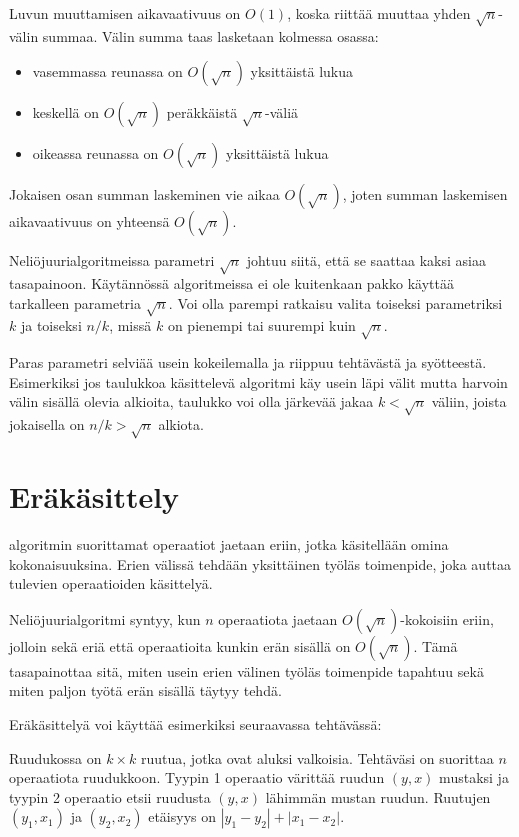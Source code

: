 Luvun muuttamisen aikavaativuus on
$O(1)$, koska riittää muuttaa yhden $\sqrt n$-välin summaa.
Välin summa taas lasketaan kolmessa osassa:

\begin{itemize}
\item vasemmassa reunassa on $O(\sqrt n)$ yksittäistä lukua
\item keskellä on $O(\sqrt n)$ peräkkäistä $\sqrt n$-väliä
\item oikeassa reunassa on $O(\sqrt n)$ yksittäistä lukua
\end{itemize}

Jokaisen osan summan laskeminen vie aikaa $O(\sqrt n)$,
joten summan laskemisen aikavaativuus on yhteensä $O(\sqrt n)$.

Neliöjuurialgoritmeissa parametri $\sqrt n$
johtuu siitä, että se saattaa kaksi asiaa tasapainoon.
Käytännössä algoritmeissa
ei ole kuitenkaan pakko käyttää
tarkalleen parametria $\sqrt n$.
Voi olla parempi ratkaisu valita toiseksi
parametriksi $k$ ja toiseksi $n/k$,
missä $k$ on pienempi tai suurempi kuin $\sqrt n$.

Paras parametri selviää usein kokeilemalla
ja riippuu tehtävästä ja syötteestä.
Esimerkiksi jos taulukkoa käsittelevä algoritmi
käy usein läpi välit mutta harvoin välin sisällä
olevia alkioita, taulukko voi olla järkevää
jakaa $k < \sqrt n$ väliin,
joista jokaisella on $n/k > \sqrt n$ alkiota.

\section{Eräkäsittely}


 algoritmin suorittamat
operaatiot jaetaan eriin,
jotka käsitellään omina kokonaisuuksina.
Erien välissä tehdään yksittäinen työläs toimenpide,
joka auttaa tulevien operaatioiden käsittelyä.

Neliöjuurialgoritmi syntyy, kun $n$ operaatiota
jaetaan $O(\sqrt n)$-kokoisiin eriin,
jolloin sekä eriä että operaatioita kunkin erän
sisällä on $O(\sqrt n)$.
Tämä tasapainottaa sitä, miten usein erien välinen
työläs toimenpide tapahtuu sekä miten paljon työtä
erän sisällä täytyy tehdä.

Eräkäsittelyä voi käyttää esimerkiksi seuraavassa tehtävässä:

\begin{task}
Ruudukossa on $k \times k$ ruutua,
jotka ovat aluksi valkoisia.
Tehtäväsi on suorittaa $n$ operaatiota ruudukkoon.
Tyypin 1 operaatio värittää ruudun $(y,x)$ mustaksi
ja tyypin 2 operaatio etsii ruudusta $(y,x)$ lähimmän
mustan ruudun.
Ruutujen $(y_1,x_1)$ ja $(y_2,x_2)$
etäisyys on $|y_1-y_2|+|x_1-x_2|$.
\end{task}

